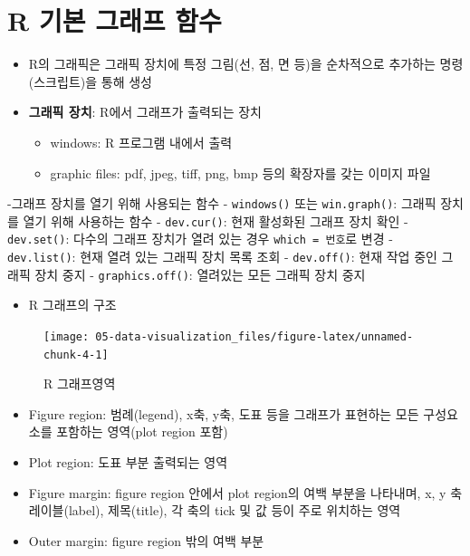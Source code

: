 \documentclass[
  11pt,
]{krantz}
\providecommand{\tightlist}{%
  \setlength{\itemsep}{0pt}\setlength{\parskip}{0pt}}
\begin{document}
\hypertarget{r-uxae30uxbcf8-uxadf8uxb798uxd504-uxd568uxc218}{%
\section{R 기본 그래프 함수}\label{r-uxae30uxbcf8-uxadf8uxb798uxd504-uxd568uxc218}}

\begin{itemize}
\item
  R의 그래픽은 그래픽 장치에 특정 그림(선, 점, 면 등)을 순차적으로 추가하는 명령(스크립트)을 통해 생성
\item
  \textbf{그래픽 장치}: R에서 그래프가 출력되는 장치

  \begin{itemize}
  \tightlist
  \item
    windows: R 프로그램 내에서 출력
  \item
    graphic files: pdf, jpeg, tiff, png, bmp 등의 확장자를 갖는 이미지 파일
  \end{itemize}
\end{itemize}

-그래프 장치를 열기 위해 사용되는 함수
- \texttt{windows()} 또는 \texttt{win.graph()}: 그래픽 장치를 열기 위해 사용하는 함수
- \texttt{dev.cur()}: 현재 활성화된 그래프 장치 확인
- \texttt{dev.set()}: 다수의 그래프 장치가 열려 있는 경우 \texttt{which\ =\ 번호}로 변경
- \texttt{dev.list()}: 현재 열려 있는 그래픽 장치 목록 조회
- \texttt{dev.off()}: 현재 작업 중인 그래픽 장치 중지
- \texttt{graphics.off()}: 열려있는 모든 그래픽 장치 중지

\begin{itemize}
\tightlist
\item
  R 그래프의 구조
\end{itemize}

\footnotesize

\begin{figure}

{\centering \texttt{[image: 05-data-visualization\_files/figure-latex/unnamed-chunk-4-1]} 

}

\caption{R 그래프영역}\label{fig:unnamed-chunk-4}
\end{figure}

\normalsize

\begin{itemize}
\tightlist
\item
  Figure region: 범례(legend), x축, y축, 도표 등을 그래프가 표현하는 모든 구성요소를 포함하는 영역(plot region 포함)
\item
  Plot region: 도표 부분 출력되는 영역
\item
  Figure margin: figure region 안에서 plot region의 여백 부분을 나타내며, x, y 축 레이블(label), 제목(title), 각 축의 tick 및 값 등이 주로 위치하는 영역
\item
  Outer margin: figure region 밖의 여백 부분
\end{itemize}
\end{document}
